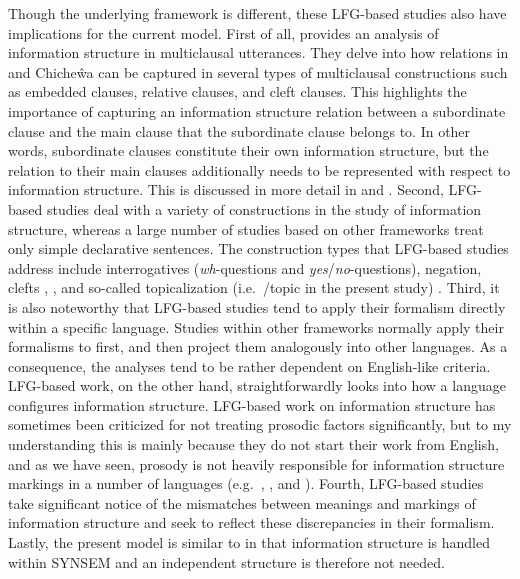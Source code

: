Though the underlying framework is different, these LFG-based studies
also have implications for the current model.  First of all,
\citet{bresnan:mchombo:87} provides an analysis of information
structure in multiclausal utterances. They delve into how 
relations in  and Chiche{\^w}a can be captured in several
types of multiclausal constructions such as embedded clauses, relative
clauses, and cleft clauses. This highlights the
importance of capturing an information structure relation between a
subordinate clause and the main clause that the subordinate clause
belongs to. In other words, subordinate clauses constitute their own
information structure, but the relation to their main clauses
additionally needs to be represented with respect to information
structure.  This is discussed in more detail in 
and .  Second, LFG-based studies deal
with a variety of constructions in the study of information structure,
whereas a large number of studies based on other frameworks treat only
simple declarative sentences. The construction types that LFG-based
studies address include interrogatives
(\textit{wh}-questions and
\textit{yes}/\textit{no}-questions), negation, clefts
\citep{king:95},  \citep{choi:99}, and so-called
topicalization (i.e.\ /topic  in the present study)
\citep{man:07}.  Third, it is also noteworthy that LFG-based studies
tend to apply their formalism directly within a specific
language. Studies within other frameworks normally apply their
formalisms to  first, and then project them analogously
into other languages. As a consequence, the analyses tend to be rather
dependent on English-like criteria. LFG-based work, on the other hand,
straightforwardly looks into how a language configures information
structure. LFG-based work on information structure has sometimes been
criticized for not treating prosodic factors significantly, but to my
understanding this is mainly because they do not start their work from
English, and as we have seen, prosody is not heavily
responsible for information structure markings in a number of
languages (e.g.\ , , and
).  Fourth, LFG-based studies take significant notice
of the mismatches between meanings and markings of information
structure and seek to reflect these discrepancies in their
formalism. Lastly, the present model is similar to
\citet{bresnan:mchombo:87} in that information structure is handled
within SYNSEM and an independent structure is therefore not needed.



